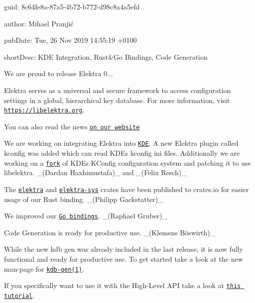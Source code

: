 
\begin{DoxyItemize}
\item guid\+: 8c64fe8a-\/87a5-\/4b72-\/b772-\/d98c8a4a5efd
\item author\+: Mihael Pranjić
\item pub\+Date\+: Tue, 26 Nov 2019 14\+:55\+:19 +0100
\item short\+Desc\+: K\+DE Integration, Rust\&Go Bindings, Code Generation
\end{DoxyItemize}

We are proud to release Elektra 0...

Elektra serves as a universal and secure framework to access configuration settings in a global, hierarchical key database. For more information, visit \href{https://libelektra.org}{\tt https\+://libelektra.\+org}.

You can also read the news \href{https://www.libelektra.org/news/0.9.1-release}{\tt on our website}


\begin{DoxyItemize}
\item We are working on integrating Elektra into \href{https://kde.org/}{\tt K\+DE}. A new Elektra plugin called {\ttfamily kconfig} was added which can read K\+DE\textquotesingle{}s kconfig ini files. Additionally we are working on a \href{https://github.com/ElektraInitiative/kconfig}{\tt fork} of K\+DE\textquotesingle{}s {\ttfamily K\+Config} configuration system and patching it to use libelektra. \+\_\+(\+Dardan Haxhimustafa)\+\_\+ and \+\_\+(\+Felix Resch)\+\_\+
\item The \href{https://crates.io/crates/elektra}{\tt elektra} and \href{https://crates.io/crates/elektra-sys}{\tt elektra-\/sys} crates have been published to crates.\+io for easier usage of our Rust binding. \+\_\+(\+Philipp Gackstatter)\+\_\+
\item We improved our \href{https://github.com/ElektraInitiative/go-elektra}{\tt Go bindings}. \+\_\+(\+Raphael Gruber)\+\_\+
\item Code Generation is ready for productive use. \+\_\+(Klemens Böswirth)\+\_\+
\end{DoxyItemize}

While the new {\ttfamily kdb gen} was already included in the last release, it is now fully functional and ready for productive use. To get started take a look at the new man-\/page for \href{https://www.libelektra.org/manpages/kdb-gen}{\tt {\ttfamily kdb-\/gen(1)}}.

If you specifically want to use it with the High-\/\+Level A\+PI take a look at \href{https://www.libelektra.org/tutorials/high-level-api}{\tt this tutorial}.

